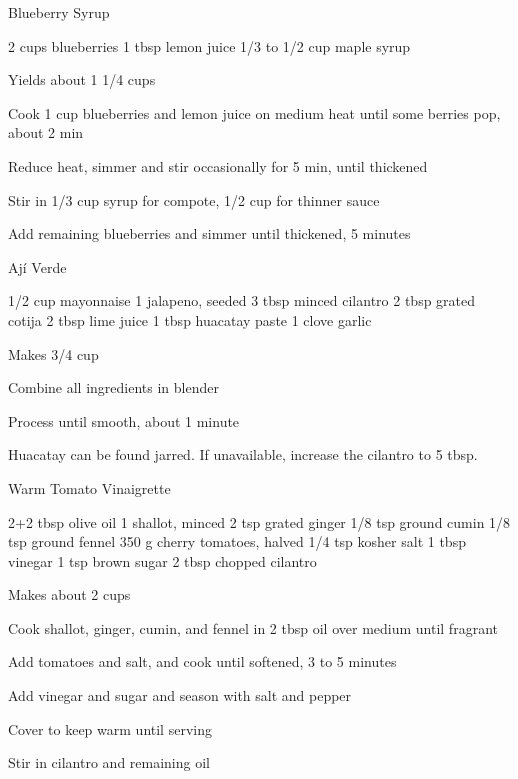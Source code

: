 \begin{recipe}{Blueberry Syrup}{}
\begin{ingredients}
2 cups blueberries
1 tbsp lemon juice
1/3 to 1/2 cup maple syrup
\end{ingredients}
\nextcolumn
Yields about 1 1/4 cups
\begin{steps}
\item Cook 1 cup blueberries and lemon juice on medium heat until some berries pop, about 2 min
\item Reduce heat, simmer and stir occasionally for 5 min, until thickened
\item Stir in 1/3 cup syrup for compote, 1/2 cup for thinner sauce
\item Add remaining blueberries and simmer until thickened, 5 minutes
\end{steps}
\end{recipe}

\begin{recipe}{Ají Verde}{}
\begin{ingredients}
1/2 cup mayonnaise
1 jalapeno, seeded
3 tbsp minced cilantro
2 tbsp grated cotija
2 tbsp lime juice
1 tbsp huacatay paste
1 clove garlic
\end{ingredients}
\nextcolumn
Makes 3/4 cup
\begin{steps}
    \item Combine all ingredients in blender
    \item Process until smooth, about 1 minute
\end{steps}
Huacatay can be found jarred. If unavailable, increase the cilantro to 5 tbsp.
\end{recipe}

\begin{recipe}{Warm Tomato Vinaigrette}{\vegetarian{}}
\begin{ingredients}
2+2 tbsp olive oil
1 shallot, minced
2 tsp grated ginger
1/8 tsp ground cumin
1/8 tsp ground fennel
350 g cherry tomatoes, halved
1/4 tsp kosher salt
1 tbsp vinegar
1 tsp brown sugar
2 tbsp chopped cilantro
\end{ingredients}
\nextcolumn
Makes about 2 cups
\begin{steps}
    \item Cook shallot, ginger, cumin, and fennel in 2 tbsp oil over medium until fragrant
    \item Add tomatoes and salt, and cook until softened, 3 to 5 minutes
    \item Add vinegar and sugar and season with salt and pepper
    \item Cover to keep warm until serving
    \item Stir in cilantro and remaining oil
\end{steps}
\end{recipe}

